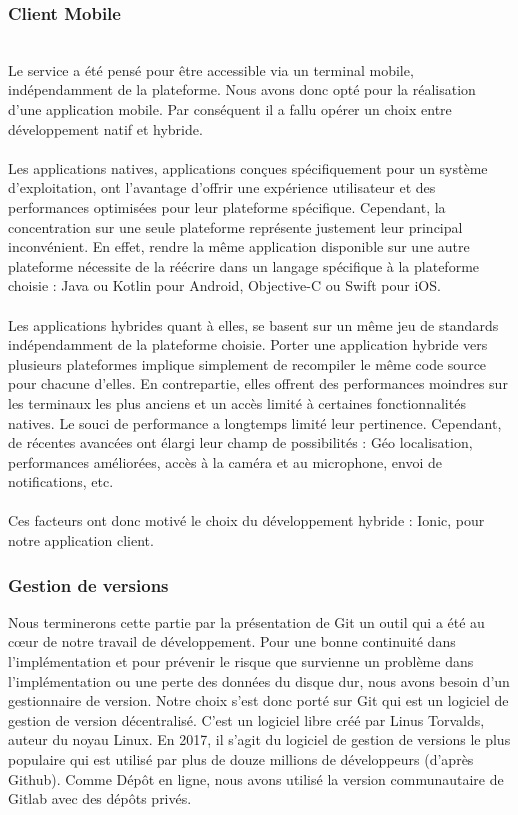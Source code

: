 \newpage
\subsubsection{Client Mobile}
$ $\\Le service a été pensé pour être accessible via un terminal mobile, indépendamment de la plateforme. Nous avons donc opté pour la réalisation d’une application mobile. Par conséquent il a fallu opérer un choix entre développement natif et hybride.
\\$ $\\Les applications natives, applications conçues spécifiquement pour un système d'exploitation, ont l'avantage d'offrir une expérience utilisateur et des performances optimisées pour leur plateforme spécifique. Cependant, la concentration sur une seule plateforme représente justement leur principal inconvénient. En effet, rendre la même application disponible sur une autre plateforme nécessite de la réécrire dans un langage spécifique à la plateforme choisie : Java ou Kotlin pour Android, Objective-C ou Swift pour iOS.
\\$ $\\Les applications hybrides quant à elles, se basent sur un même jeu de standards indépendamment de la plateforme choisie. Porter une application hybride vers plusieurs plateformes implique simplement de recompiler le même code source pour chacune d'elles. En contrepartie, elles offrent des performances moindres sur les terminaux les plus anciens et un accès limité à certaines fonctionnalités natives. Le souci de performance a longtemps limité leur pertinence. Cependant, de récentes avancées ont élargi leur champ de possibilités : Géo localisation, performances améliorées, accès à la caméra et au microphone, envoi de notifications, etc.
\\$ $\\Ces facteurs ont donc motivé le choix du développement hybride : Ionic, pour notre application client.
\subsubsection{Gestion de versions}
Nous terminerons cette partie par la présentation de Git un outil qui a été au cœur de notre travail de développement. Pour une bonne continuité dans l’implémentation et pour prévenir le risque que survienne un problème dans l’implémentation ou une perte des données du disque dur, nous avons besoin d’un gestionnaire de version. Notre choix s'est donc porté sur Git qui est un logiciel de gestion de version décentralisé. C'est un logiciel libre créé par Linus Torvalds, auteur du noyau Linux. En 2017, il s’agit du logiciel de gestion de versions le plus populaire qui est utilisé par plus de douze millions de développeurs (d’après Github). Comme Dépôt en ligne, nous avons utilisé la version communautaire de Gitlab avec des dépôts privés.

